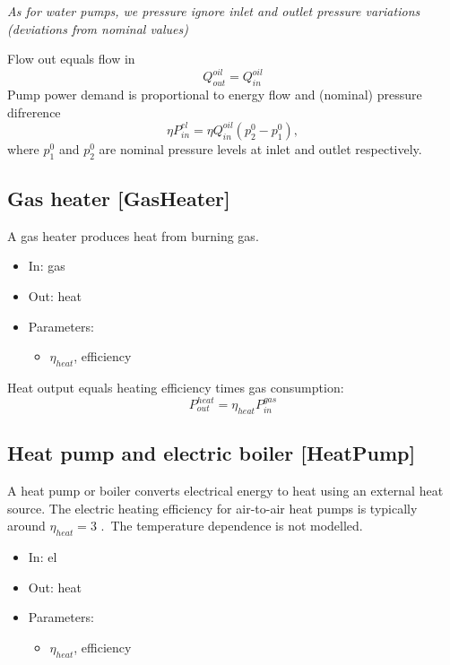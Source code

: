 \documentclass[12pt]{article}
\begin{document}
\textit{As for water pumps, we pressure ignore inlet and outlet pressure variations (deviations from nominal values)}

Flow out equals flow in
\begin{equation}
	Q_{out}^{oil}=Q_{in}^{oil}
\end{equation}
Pump power demand is proportional to energy flow and (nominal) pressure difrerence
\begin{equation}
	\eta P^{el}_{in} = \eta Q_{in}^{oil}(p^0_2-p^0_1),
\end{equation}
where $p^0_1$ and $p^0_2$ are nominal pressure levels at inlet and outlet respectively.


\subsection{Gas heater [GasHeater]}
A gas heater produces heat from burning gas.

\begin{itemize}
\item In: gas
\item Out: heat
\item Parameters:
\begin{itemize}[noitemsep,topsep=0pt]
	\item $\eta_{heat}$,  efficiency
\end{itemize}
\end{itemize}

Heat output equals heating efficiency times gas consumption:
\begin{equation}
	P_{out}^{heat}= \eta _{heat}P_{in}^{gas}
\end{equation}



\subsection{Heat pump and electric boiler [HeatPump]}

A heat pump or boiler converts electrical energy to heat using an external heat source. The electric heating efficiency for air-to-air heat pumps is typically around  \(  \eta _{heat}=3 \) .\  The temperature dependence is not modelled.

\begin{itemize}
\item In: el
\item Out: heat
\item Parameters:
\begin{itemize}[noitemsep,topsep=0pt]
	\item $\eta_{heat}$,  efficiency
\end{itemize}
\end{itemize}
\end{document}
